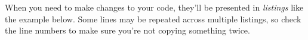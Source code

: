 	When you need to make changes to your code, they'll be presented in \textit{listings} like the example below. Some lines may be repeated across multiple listings, so check the line numbers to make sure you're not copying something twice.

	
	
	